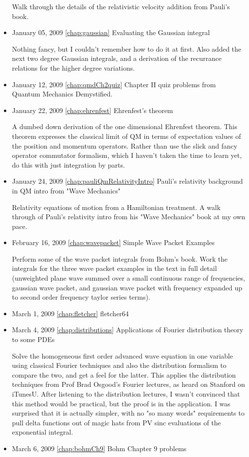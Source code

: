 \begin{itemize}
Walk through the details of the relativistic velocity addition from Pauli's book.\item January 05, 2009 \ref{chap:gaussian} Evaluating the Gaussian integral

Nothing fancy, but I couldn't remember how to do it at first.  Also added the next two degree Gaussian integrals, and a derivation of the recurrance relations for the higher degree variations. \item January 12, 2009 \ref{chap:qmdCh2quiz} Chapter II quiz problems from Quantum Mechanics Demystified.

\item January 22, 2009 \ref{chap:ehrenfest} Ehrenfest's theorem

A dumbed down derivation of the one dimensional Ehrenfest theorem.  This theorem expresses the classical limit of QM in terms of expectation values of the position and momentum operators.  Rather than use the slick and fancy operator commutator formalism, which I haven't taken the time to learn yet, do this with just integration by parts. \item January 24, 2009 \ref{chap:pauliQmRelativityIntro} Pauli's relativity background in QM intro from "Wave Mechanics"

Relativity equations of motion from a Hamiltonian treatment.  A walk through of Pauli's relativity intro from his "Wave Mechanics" book at my own pace.\item February 16, 2009 \ref{chap:wavepacket} Simple Wave Packet Examples

Perform some of the wave packet integrals from Bohm's book.   Work the integrals for the three wave packet examples in the text in full detail (unweighted plane wave summed over a small continuous range of frequencies, gaussian wave packet, and gaussian wave packet with frequency expanded up to second order frequency taylor series terms).\item March 1, 2009 \ref{chap:fletcher} fletcher64

\item March 4, 2009 \ref{chap:distributions} Applications of Fourier distribution theory to some PDEs

Solve the homogeneous first order advanced wave equation in one variable using classical Fourier techniques and also the distribution formalism to compare the two, and get a feel for the latter.  This applies the distribution techniques from Prof Brad Osgood's Fourier lectures, as heard on Stanford on iTunesU.  After listening to the distribution lectures, I wasn't convinced that this method would be practical, but the proof is in the application.  I was surprised that it is actually simpler, with no "so many words" requirements to pull delta functions out of magic hats from PV sinc evaluations of the exponential integral. \item March 6, 2009 \ref{chap:bohmCh9} Bohm Chapter 9 problems


\end{itemize}
